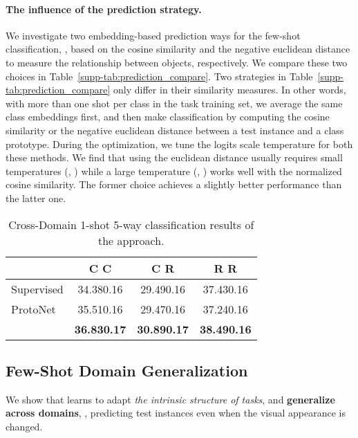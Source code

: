 \paragraph{The influence of the prediction strategy.} We investigate two embedding-based prediction ways for the few-shot classification, \ie, based on the cosine similarity and the negative euclidean distance to measure the relationship between objects, respectively. We compare these two choices in Table~\ref{supp-tab:prediction_compare}. 
Two strategies in Table~\ref{supp-tab:prediction_compare} only differ in their similarity measures. In other words, with more than one shot per class in the task training set, we average the same class embeddings first, and then make classification by computing the cosine similarity or the negative euclidean distance between a test instance and a class prototype. 
During the optimization, we tune the logits scale temperature for both these methods. 
We find that using the euclidean distance usually requires small temperatures (\eg, ) while a large temperature (\eg, ) works well with the normalized cosine similarity. The former choice achieves a slightly better performance than the latter one.

\begin{table}[tbp]
	\small
	\tabcolsep 5pt
	\centering
	\caption{Cross-Domain 1-shot 5-way classification results of the {\feat} approach.}
	\begin{tabular}{@{\;}lccc@{\;}}
		\addlinespace
		\toprule
		& \bf C  C & \bf C  R & \bf R  R\\ 
		\midrule
		Supervised     & 34.38{\tiny 0.16} & 29.49{\tiny 0.16} & 37.43{\tiny 0.16}\\
		{ProtoNet}    & 35.51{\tiny 0.16} &  29.47{\tiny 0.16} & 37.24{\tiny 0.16}\\
		\midrule
		{\feat}      & \bf 36.83{\tiny 0.17} & \bf 30.89{\tiny 0.17} & \bf 38.49{\tiny 0.16}\\
		\bottomrule
	\end{tabular}
	\label{supp-tab:generalization1}
\end{table}

\subsection{Few-Shot Domain Generalization} 
\label{sec:supp-generalization}
We show that \feat learns to adapt \textit{the intrinsic structure of tasks}, and \textbf{generalize across domains}, \ie, predicting test instances even when the visual appearance is changed.


